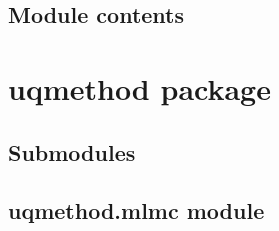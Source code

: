 \documentclass[letterpaper,10pt,english]{sphinxmanual}
\begin{document}
\section{Module contents}
\label{\detokenize{stochvar:module-stochvar}}\label{\detokenize{stochvar:module-contents}}

\chapter{uqmethod package}
\label{\detokenize{uqmethod:uqmethod-package}}\label{\detokenize{uqmethod::doc}}

\section{Submodules}
\label{\detokenize{uqmethod:submodules}}

\section{uqmethod.mlmc module}
\label{\detokenize{uqmethod:module-uqmethod.mlmc}}\label{\detokenize{uqmethod:uqmethod-mlmc-module}}
\end{document}
